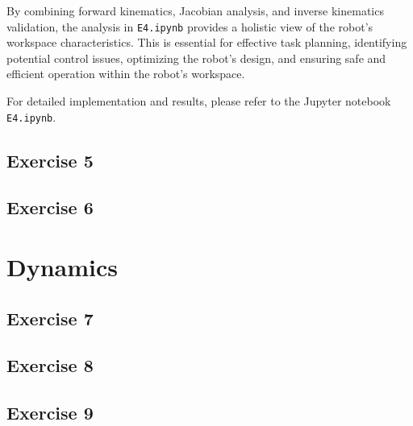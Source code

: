 \begin{solution}
By combining forward kinematics, Jacobian analysis, and inverse kinematics validation, the analysis in \texttt{E4.ipynb} provides a holistic view of the robot's workspace characteristics. This is essential for effective task planning, identifying potential control issues, optimizing the robot's design, and ensuring safe and efficient operation within the robot's workspace.

For detailed implementation and results, please refer to the Jupyter notebook \texttt{E4.ipynb}.
\end{solution}
\subsection{Exercise 5}
\lipsum[9]

\begin{solution}
    \lipsum[10]
\end{solution}

\subsection{Exercise 6}
\lipsum[11]

\begin{solution}
    \lipsum[12]
\end{solution}

\section{Dynamics}
\subsection{Exercise 7}
\lipsum[13]

\begin{solution}
    \lipsum[14]
\end{solution}

\subsection{Exercise 8}
\lipsum[15]

\begin{solution}
    \lipsum[16]
\end{solution}

\subsection{Exercise 9}
\lipsum[17]

\begin{solution}
    \lipsum[18]
\end{solution}
